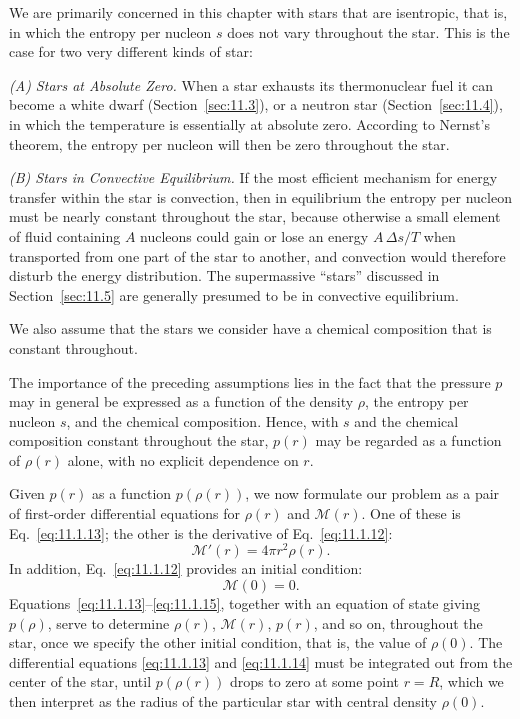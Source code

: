 We are primarily concerned in this chapter with stars that are isentropic,
that is, in which the entropy per nucleon \(s\) does not vary throughout the
star. This is the case for two very different kinds of star:

\emph{(A) Stars at Absolute Zero.} When a star exhausts its thermonuclear fuel
it can become a white dwarf (Section~\ref{sec:11.3}), or a neutron star
(Section~\ref{sec:11.4}), in which the temperature is essentially at absolute
zero. According to Nernst's theorem, the entropy per nucleon will then be zero
throughout the star.

\emph{(B) Stars in Convective Equilibrium.} If the most efficient mechanism
for energy transfer within the star is convection, then in equilibrium the
entropy per nucleon must be nearly constant throughout the star, because
otherwise a small element of fluid containing \(A\) nucleons could gain or
lose an energy \(A\,\Delta s/T\) when transported from one part
of the star to another, and convection would therefore disturb the energy
distribution. The supermassive ``stars'' discussed in
Section~\ref{sec:11.5} are generally presumed to be in convective equilibrium.

We also assume that the stars we consider have a chemical composition that is
constant throughout.

The importance of the preceding assumptions lies in the fact that the pressure
\(p\) may in general be expressed as a function of the density \(\rho\), the
entropy per nucleon \(s\), and the chemical composition. Hence, with \(s\) and
the chemical composition constant throughout the star, \(p(r)\) may be
regarded as a function of \(\rho(r)\) alone, with no explicit dependence on
\(r\).

Given \(p(r)\) as a function \(p(\rho(r))\), we now formulate our problem as a
pair of first-order differential equations for \(\rho(r)\) and
\(\mathcal{M}(r)\). One of these is Eq.~\eqref{eq:11.1.13}; the other is the
derivative of Eq.~\eqref{eq:11.1.12}:
\begin{equation}
  \mathcal{M}'(r)=4\pi r^2\rho(r).
  \tag{11.1.14}\label{eq:11.1.14}
\end{equation}
In addition, Eq.~\eqref{eq:11.1.12} provides an initial condition:
\begin{equation}
  \mathcal{M}(0)=0.
  \tag{11.1.15}\label{eq:11.1.15}
\end{equation}
Equations~\eqref{eq:11.1.13}--\eqref{eq:11.1.15}, together with an equation
of state giving \(p(\rho)\), serve to determine \(\rho(r)\),
\(\mathcal{M}(r)\), \(p(r)\), and so on, throughout the star, once we specify
the other initial condition, that is, the value of \(\rho(0)\). The
differential equations \eqref{eq:11.1.13} and \eqref{eq:11.1.14} must be
integrated out from the center of the star, until \(p(\rho(r))\) drops to zero
at some point \(r=R\), which we then interpret as the radius of the particular
star with central density \(\rho(0)\).

